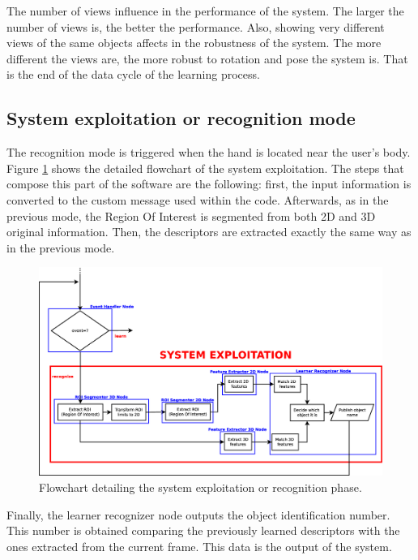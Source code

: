 The number of views influence in the performance of the system. 
The larger the number of views is, the better the performance. 
Also, showing very different views of the same objects affects in the robustness of the system. 
The more different the views are, the more robust to rotation and pose the system is. 
That is the end of the data cycle of the learning process. 


\subsection{System exploitation or recognition mode}


The recognition mode is triggered when the hand is located near the user's body. 
Figure \ref{flowchart3} shows the detailed flowchart of the system exploitation. 
The steps that compose this part of the software are the following:
first, the input information is converted to the custom message used within the code. Afterwards, as in the previous mode, the Region Of Interest is segmented from both 2D and 3D original information. Then, the descriptors are extracted exactly the same way as in the previous mode. 
\\

\begin{figure}[H]
	\begin{center}
\includegraphics[width=\linewidth]{img/diagrams/flowchart3.eps}
	\caption[System exploitation flowchart]{Flowchart detailing the system exploitation or recognition phase.}
		\label{flowchart3}

	\end{center}
\end{figure}



Finally, the learner recognizer node outputs the object identification number. 
This number is obtained comparing the previously learned descriptors with the ones extracted from the current frame. 
This data is the output of the system. 

